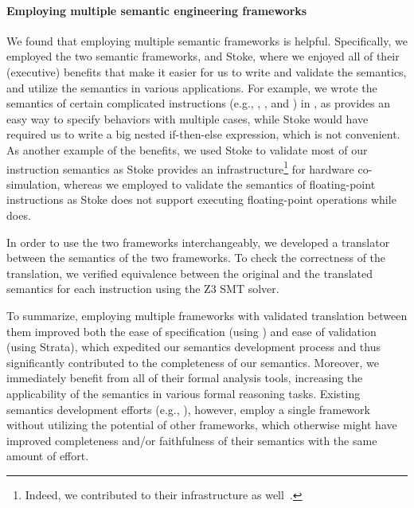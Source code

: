 \paragraph{Employing multiple semantic engineering frameworks}

We found that employing multiple semantic frameworks is helpful. Specifically, we employed the two semantic frameworks, \K and Stoke, where we enjoyed all of their (executive) benefits that make it easier for us to write and validate the semantics, and utilize the semantics in various applications. For example, we wrote the semantics of certain complicated instructions (e.g., , , and ) in \K, as \K provides an easy way to specify behaviors with multiple cases, while Stoke would have required us to write a big nested if-then-else expression, which is not convenient. As another example of the benefits, we used Stoke to validate most of our instruction semantics
as Stoke provides an infrastructure\footnote{Indeed, we contributed to their infrastructure as well~\cite{completing-stock,improving-stoke}.} for hardware co-simulation, whereas we employed \K to validate the semantics of floating-point instructions as Stoke does not support executing floating-point operations while \K does.

In order to use the two frameworks interchangeably, we developed a translator between the semantics of the two frameworks. To check the correctness of the translation, we verified equivalence between the original and the translated semantics for each instruction using the Z3 SMT solver.

To summarize, employing multiple frameworks with validated translation between them improved both the ease of specification (using \K) and ease of validation (using Strata), which expedited our semantics development process and thus significantly contributed to the completeness of our semantics. Moreover, we immediately benefit from all of their formal analysis tools, increasing the applicability of the semantics in various formal reasoning tasks. Existing semantics development efforts (e.g., \cite{Goel:FMCAD14,Heule2016a}), however, %
employ a single framework without utilizing the potential of other frameworks, which otherwise might have improved completeness and/or faithfulness of their semantics with the same amount of effort.
%
